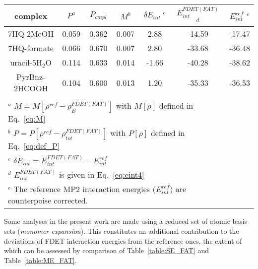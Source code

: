 \documentclass[amsmath,amssymb,preprint,aip,jcp]{revtex4-1}
\newcommand{\nr}[1]{\color{red}#1\color{black}}
\begin{document}
\begin{table*}
{
\begin{center}
\begin{tabular}{|c|c|c|c|c|c|c|}
\hline
 complex & $P^a$ & $P_{cmpl}$ & $M^b$ & $\delta E_{int}\;^c$&$E^{FDET(FAT)}_{int}$ $^d$&$E_{int}^{ref}$ $^e$ \\ \hline
7HQ-2MeOH & 0.059 & 0.362 & 0.007 & 2.88 & -14.59 & -17.47 \\ \hline
7HQ-formate & 0.066 & 0.670 & 0.007 &  2.80 & -33.68 & -36.48 \\ \hline
uracil-5H$_2$O & 0.114 & 0.633 &  0.014 & -1.66 & -40.28 & -38.62 \\ \hline
PyrBnz-2HCOOH  & 0.104 & 0.600 & 0.013 & 1.20 & -35.33 &  -36.53 \\ \hline
\multicolumn{6}{c}{ } \\
\multicolumn{6}{l}{$^a$ $M=M[\rho^{ref} - \rho^{FDET(FAT)}_{B}]$ with $M[\rho]$ defined in Eq.~\ref{eq:M}}\\
\multicolumn{6}{l}{$^b$ $P=P[\rho^{ref} - \rho_{tot}^{FDET(FAT)}]$ with $P[\rho]$ defined in Eq.~\ref{eq:def_P}}\\
\multicolumn{6}{l}{$^c$ $\delta E_{int}=E^{FDET(FAT)}_{int}-E_{int}^{ref}$} \\
\multicolumn{6}{l}{$^d$ $E^{FDET(FAT)}_{int}$ is given in Eq.~\ref{eq:eint4}}\\
\multicolumn{6}{l}{$^e$ The reference MP2 interaction energies ($E_{int}^{ref}$) are \nr{counterpoise } corrected.}
\end{tabular}
\end{center}
}%
\caption{Deviations of the FDET-MP2 results from the reference data.  In FDET, \textit{freeze-and-thaw} optimised $\rho_B$ and the reduced set of atomic basis sets ({\it supermolecular expansion}) are used. 
Density measures $M$ and $P$ are given in atomic units, energies in kcal/mol.
}
\label{table:SE_FAT}
\end{table*}

Some analyses in the present work are made using a reduced set of atomic basis sets ({\it monomer expansion}). This \nr{constitutes an additional contribution } to the deviations of FDET interaction energies from the reference ones\nr{, the extent of which can be assessed by comparison of Table~\ref{table:SE_FAT} and Table~\ref{table:ME_FAT}}.
\end{document}
